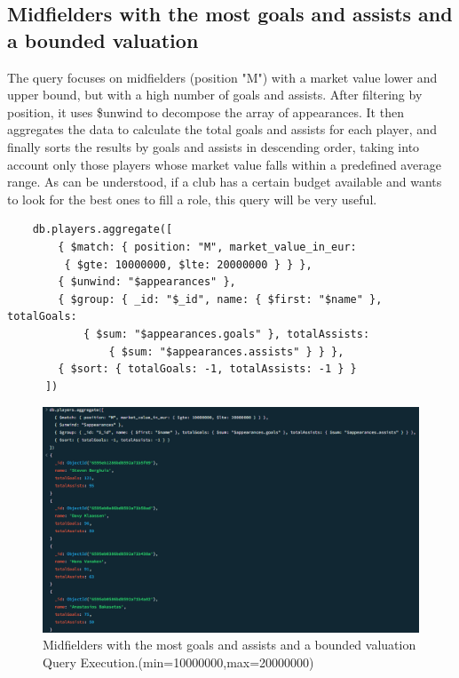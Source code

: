 \documentclass{Configuration_Files/PoliMi3i_thesis}
\begin{document}
\subsection{Midfielders with the most goals and assists and a bounded valuation}
The query focuses on midfielders (position "M") with a market value lower and upper bound, but with a high number of goals and assists. After filtering by position, it uses \$unwind to decompose the array of appearances. It then aggregates the data to calculate the total goals and assists for each player, and finally sorts the results by goals and assists in descending order, taking into account only those players whose market value falls within a predefined average range. As can be understood, if a club has a certain budget available and wants to look for the best ones to fill a role, this query will be very useful.
\begin{verbatim}
    db.players.aggregate([
        { $match: { position: "M", market_value_in_eur:
         { $gte: 10000000, $lte: 20000000 } } },
        { $unwind: "$appearances" },
        { $group: { _id: "$_id", name: { $first: "$name" }, totalGoals: 
            { $sum: "$appearances.goals" }, totalAssists: 
                { $sum: "$appearances.assists" } } },
        { $sort: { totalGoals: -1, totalAssists: -1 } }
      ])    
\end{verbatim}

\begin{figure}[htbp]
    \centering
    \includegraphics[scale=0.6]{Images/Queries/Midfielders_goal_assit_bounded_value/mgabv.png}
    \caption{Midfielders with the most goals and assists and a bounded valuation Query Execution.(min=10000000,max=20000000)}
\end{figure}
\end{document}
